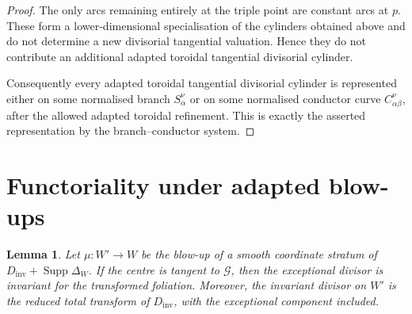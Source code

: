 \documentclass[11pt]{amsart}
\numberwithin{equation}{section}
\theoremstyle{plain}
\newtheorem{Lemma}[Theorem]{Lemma}
\theoremstyle{definition}
\newcommand{\Supp}{\operatorname{Supp}}
\newcommand{\Dinv}{D_{\mathrm{inv}}}
\newcommand{\cG}{\mathcal G}
\begin{document}
\begin{proof}
The only arcs remaining entirely at the triple point are constant arcs at \(p\). These form a lower-dimensional specialisation of the cylinders obtained above and do not determine a new divisorial tangential valuation. Hence they do not contribute an additional adapted toroidal tangential divisorial cylinder.

Consequently every adapted toroidal tangential divisorial cylinder is represented either on some normalised branch \(S_\alpha^\nu\) or on some normalised conductor curve \(C_{\alpha\beta}^\nu\), after the allowed adapted toroidal refinement. This is exactly the asserted representation by the branch--conductor system.
\end{proof}


\section{Functoriality under adapted blow-ups}
\label{sec:functoriality}

\begin{Lemma}
\label{lem:branch-transform}
Let $\mu:W'\to W$ be the blow-up of a smooth coordinate stratum of $\Dinv+\Supp\Delta_W$. If the centre is tangent to $\cG$, then the exceptional divisor is invariant for the transformed foliation. Moreover, the invariant divisor on $W'$ is the reduced total transform of $\Dinv$, with the exceptional component included.
\end{Lemma}
\end{document}
